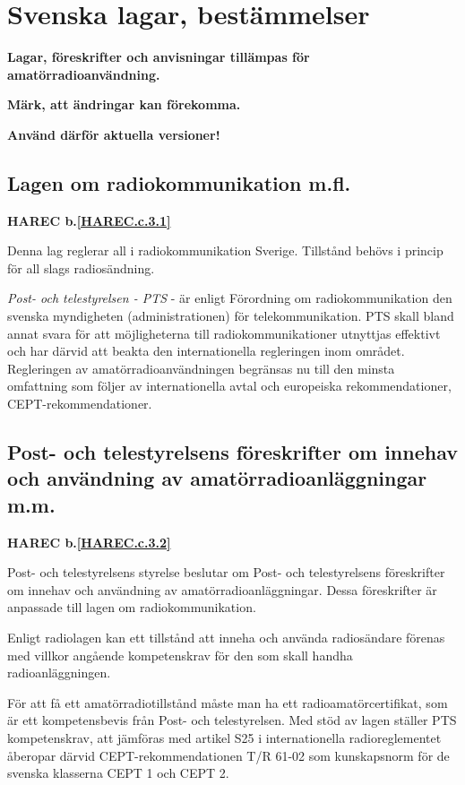 \section{Svenska lagar, bestämmelser}


\textbf{Lagar, föreskrifter och anvisningar tillämpas för
  amatörradioanvändning.}

\textbf{Märk, att ändringar kan förekomma.}

\textbf{Använd därför aktuella versioner!}


\subsection{Lagen om radiokommunikation m.fl.}
\textbf{
HAREC b.\ref{HAREC.c.3.1}\label{myHAREC.c.3.1}
}

Denna lag reglerar all i radiokommunikation Sverige. Tillstånd behövs
i princip för all slags radiosändning.

\emph{Post- och telestyrelsen - PTS} - är enligt Förordning om
radiokommunikation den svenska myndigheten (administrationen) för
telekommunikation. PTS skall bland annat svara för att möjligheterna
till radiokommunikationer utnyttjas effektivt och har därvid att
beakta den internationella regleringen inom området. Regleringen av
amatörradioanvändningen begränsas nu till den minsta omfattning som
följer av internationella avtal och europeiska rekommendationer,
CEPT-rekommendationer.

\subsection{Post- och telestyrelsens föreskrifter om innehav och
användning av amatörradioanläggningar m.m.}
\textbf{
HAREC b.\ref{HAREC.c.3.2}\label{myHAREC.c.3.2}
}

Post- och telestyrelsens styrelse beslutar om Post- och telestyrelsens
föreskrifter om innehav och användning av amatörradioanläggningar.
Dessa föreskrifter är anpassade till lagen om radiokommunikation.

Enligt radiolagen kan ett tillstånd att inneha och använda
radiosändare förenas med villkor angående kompetenskrav för den som
skall handha radioanläggningen.

För att få ett amatörradiotillstånd måste man ha ett
radioamatörcertifikat, som är ett kompetensbevis från Post- och
telestyrelsen. Med stöd av lagen ställer PTS kompetenskrav, att jämföras
med artikel S25 i internationella radioreglementet åberopar därvid
CEPT-rekommendationen T/R 61-02 som kunskapsnorm för de svenska
klasserna CEPT 1 och CEPT 2.

